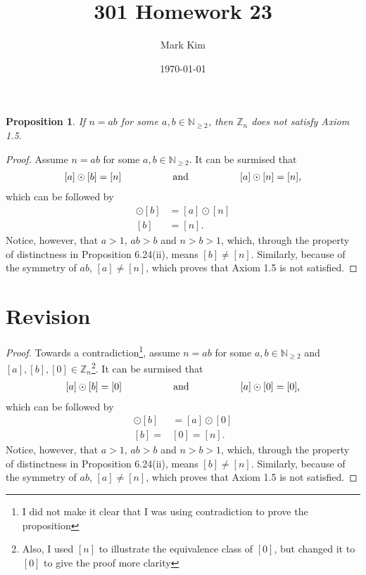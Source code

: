 \documentclass[12pt]{amsart}
\title{301 Homework 23}
\author{Mark Kim}
\date{\today}
\newcommand{\Z}{\mathbb{Z}}
\newcommand{\N}{\mathbb{N}}
\newtheorem*{proposition}{Proposition}
\begin{document}
\maketitle

\begin{proposition}
If $n=ab$ for some $a,b\in \N_{\geq2}$, then $\Z_n$ does not satisfy Axiom 1.5.
\end{proposition}

\begin{proof}
Assume $n=ab$ for some $a,b\in \N_{\geq2}$.  It can be surmised that
\[
\begin{tabular}{ c c c c c }
$[a] \odot [b] = [n]$ & \hspace{1cm} & and & \hspace{1cm} & $[a] \odot [n] = [n]$,\\
\end{tabular}
\]
which can be followed by
\begin{align*}
[a] \odot [b] &= [a] \odot [n]\\
[b] &= [n].
\end{align*}
Notice, however, that $a>1$, $ab > b$ and $n > b > 1$, which, through the property of distinctness in Proposition 6.24(ii), means $[b] \neq [n]$.  Similarly, because of the symmetry of $ab$, $[a] \neq [n]$, which proves that Axiom 1.5 is not satisfied.
\end{proof}

\section{Revision}

\begin{proof}
Towards a contradiction\footnote{I did not make it clear that I was using contradiction to prove the proposition}, assume $n=ab$ for some $a,b\in \N_{\geq2}$ and $[a],[b],[0]\in\Z_n$\footnote{Also, I used $[n]$ to illustrate the equivalence class of $[0]$, but changed it to $[0]$ to give the proof more clarity}.  It can be surmised that
\[
\begin{tabular}{ c c c c c }
$[a] \odot [b] = [0]$ & \hspace{1cm} & and & \hspace{1cm} & $[a] \odot [0] = [0]$,\\
\end{tabular}
\]
which can be followed by
\begin{align*}
[a] \odot [b] &= [a] \odot [0]\\
[b] = &[0] = [n].
\end{align*}
Notice, however, that $a>1$, $ab > b$ and $n > b > 1$, which, through the property of distinctness in Proposition 6.24(ii), means $[b] \neq [n]$.  Similarly, because of the symmetry of $ab$, $[a] \neq [n]$, which proves that Axiom 1.5 is not satisfied.
\end{proof}
\end{document}
